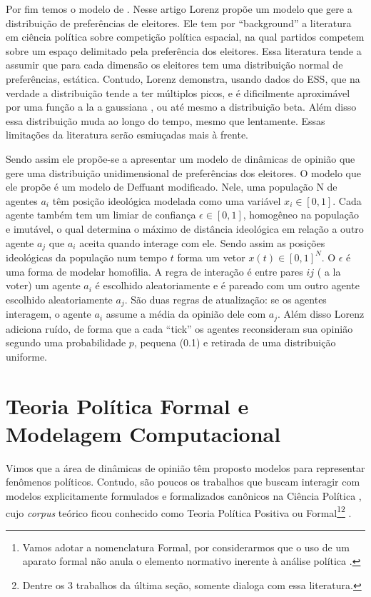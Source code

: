 Por fim temos o modelo de . Nesse artigo Lorenz
propõe um modelo que gere a distribuição de preferências de eleitores. Ele tem
por ``background'' a literatura em ciência política sobre competição política
espacial, na qual partidos competem sobre um espaço delimitado pela preferência
dos eleitores. Essa literatura tende a assumir que para cada dimensão os
eleitores tem uma distribuição normal de preferências, estática. Contudo, Lorenz
demonstra, usando dados do ESS, que na verdade a distribuição tende a
ter
múltiplos picos, e é dificilmente aproximável por uma função a la a gaussiana ,
ou até mesmo a distribuição beta. Além disso essa distribuição muda ao longo do
tempo, mesmo que lentamente. Essas limitações da literatura serão esmiuçadas
mais à frente.

Sendo assim ele propõe-se a apresentar um modelo de dinâmicas de opinião que
gere uma distribuição unidimensional de preferências dos eleitores. O modelo que
ele propõe é um modelo de Deffuant modificado. Nele, uma população N de agentes
$a_i$ têm posição ideológica modelada como uma variável $x_i \in [0,1]$. Cada
agente também tem um limiar de confiança $\epsilon \in [0,1]$, homogêneo na população e
imutável, o qual determina o máximo de distância ideológica em relação a outro
agente $a_j$ que $a_i$ aceita quando interage com ele. Sendo assim as posições
ideológicas da população num tempo $t$ forma um vetor $x(t) \in [0,1]^N$. O $\epsilon$ é
uma forma de modelar homofilia. A regra de interação é entre pares $ij$ ( a la
voter) um agente $a_i$ é escolhido aleatoriamente e é pareado com um outro
agente escolhido aleatoriamente $a_j$. São duas regras de atualização: se os
agentes interagem, o agente $a_i$ assume a média da opinião dele com $a_j$. Além
disso Lorenz adiciona ruído, de forma que a cada ``tick'' os agentes
reconsideram sua opinião segundo uma probabilidade $p$, pequena (0.1) e retirada
de uma distribuição uniforme.

\section{Teoria Política Formal e Modelagem Computacional}

\quad \quad Vimos que a área de dinâmicas de opinião têm proposto modelos para
representar fenômenos políticos. Contudo, são poucos os trabalhos que buscam
interagir com modelos explicitamente formulados e formalizados canônicos na
Ciência Política , cujo \textit{corpus} teórico ficou conhecido como Teoria
Política Positiva ou Formal\footnote{Vamos adotar a nomenclatura Formal, por
  considerarmos que o uso de um aparato formal não anula o elemento normativo
  inerente à análise política
  \cite{johnson2010rationality,knight2015attempts}.}\footnote{Dentre os 3
  trabalhos da última seção, somente  dialoga com essa
  literatura.} 
\cite{ordeshook1986game,ordeshook1992political,austen1999positive}.

